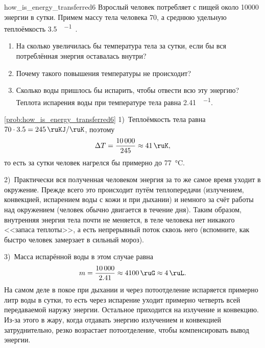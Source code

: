 \begin{problem}{}{how_is_energy_transferred6}
    Взрослый человек потребляет с пищей около \qty{10000}{\ruKJ} энергии в сутки. Примем массу тела человека \qty{70}{\ruKg}, а среднюю удельную теплоёмкость \qty{3,5}{\ruKJ\per\ruKg\ruK}.

    \begin{enumerate}[label=\arabic*)]
        \item На сколько увеличилась бы температура тела за сутки, если бы вся потреблённая энергия оставалась внутри?
        \item Почему такого повышения температуры не происходит?
        \item Сколько воды пришлось бы испарить, чтобы отвести всю эту энергию? Теплота испарения воды при температуре тела равна \qty{2,41}{\ruKJ\per\ruG}.
    \end{enumerate}
    \begin{sol}{\ref{prob:how_is_energy_transferred6}}
        1)~Теплоёмкость тела равна $\num{70} \cdot \num{3,5} = \qty{245}{\ruKJ\per\ruK}$, поэтому
        \begin{equation*}
            \Delta T = \frac{\num{10000}}{\num{245}} \approx \qty{41}{\ruK},
        \end{equation*}
        то есть за сутки человек нагрелся бы примерно до \qty{77}{\degreeCelsius}.

        2)~Практически вся полученная человеком энергия за то же самое время уходит в окружение. Прежде всего это происходит путём теплопередачи (излучением, конвекцией, испарением воды с кожи и при дыхании) и немного за счёт работы над окружением (человек обычно двигается в течение дня). Таким образом, внутренняя энергия тела почти не меняется, в теле человека нет никакого <<запаса теплоты>>, а есть непрерывный поток сквозь него (вспомните, как быстро человек замерзает в сильный мороз).

        3)~Масса испарённой воды в этом случае равна
        \begin{equation*}
            m = \frac{\num{10000}}{\num{2,41}} \approx \qty{4100}{\ruG} \approx \qty{4}{\ruL}.
        \end{equation*}
        На самом деле в покое при дыхании и через потоотделение испаряется примерно литр воды в сутки, то есть через испарение уходит примерно четверть всей передаваемой наружу энергии. Остальное приходится на излучение и конвекцию. Из-за этого в жару, когда отдавать энергию излучением и конвекцией затруднительно, резко возрастает потоотделение, чтобы компенсировать вывод энергии.
    \end{sol}
\end{problem}

